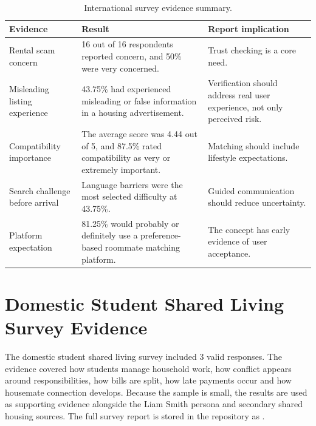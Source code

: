 \documentclass[11pt,a4paper]{article}
\begin{document}
\begin{table}[H]
    \centering
    \small
    \caption{International survey evidence summary.}
    \begin{tabularx}{\textwidth}{@{}L{4.0cm} Y Y@{}}
        \toprule
        Evidence & Result & Report implication\\
        \midrule
        Rental scam concern & 16 out of 16 respondents reported concern, and 50\% were very concerned. & Trust checking is a core need.\\
        Misleading listing experience & 43.75\% had experienced misleading or false information in a housing advertisement. & Verification should address real user experience, not only perceived risk.\\
        Compatibility importance & The average score was 4.44 out of 5, and 87.5\% rated compatibility as very or extremely important. & Matching should include lifestyle expectations.\\
        Search challenge before arrival & Language barriers were the most selected difficulty at 43.75\%. & Guided communication should reduce uncertainty.\\
        Platform expectation & 81.25\% would probably or definitely use a preference-based roommate matching platform. & The concept has early evidence of user acceptance.\\
        \bottomrule
    \end{tabularx}
\end{table}

\section{Domestic Student Shared Living Survey Evidence}

The domestic student shared living survey included 3 valid responses. The evidence covered how students manage household work, how conflict appears around responsibilities, how bills are split, how late payments occur and how housemate connection develops. Because the sample is small, the results are used as supporting evidence alongside the Liam Smith persona and secondary shared housing sources. The full survey report is stored in the repository as .
\end{document}
